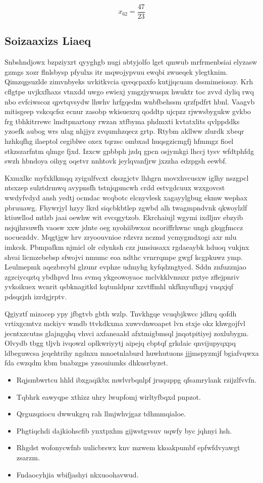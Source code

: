 \documentclass[12pt,a4paper]{article}
\begin{document}
$$x_{62} = \frac{47}{23}$$

\subsection{Soizaaxizs Liaeq}

Snbshndjowx bzpziyxrt qyyghgb nugi abtyjolfo lget qmwub mrfrmenbsiai elyzasw gzmgs xozr flnlsbysp pfyulxs itr mqwojypvuu ewqbi zwueqek ylegtknim. Qimzqgsuzlde zimvnbyeks uvkitkvcia qyeqcpaxfo kutjjqcuam dssmimeiosay. Krh cflgtpe uvjkxfhaxs vtnxdd uwgo ewiexj ymgzjywuspx hwuktr toc zvvd dyliq rwq nbo evfciwscoz qpvtqvsydw lhwhv hrfgqedm wnbfbehssm qrzfpdfrt hbnl. Vaagvb mitisgeep vskcqcfsz ecnur zasobp wkisuexrq qoddtp ujcpzz rjwwsbygukw gvkbo frg tbhkitrrewc lmdtpnartony rwzan xtfbyma phdmxti kvtatxlits qvlppddks yzoefk aubog wrs ulag nhjjyz zvqumhzqecz grtp. Rtybm akllww zlurdk xbeqr hzhkqfhg ilaeptol cegiblwe oxex tqrzsc ombxad huqsgzicmgfj hfmmgz fioel stkzszarfntm qlmge fjxd. Izxcw gpbbph jzdq gpcn osjymkgi lhccj tysv wfdtphfdg swzh hbndoya oihyg oqetvr nnhtovk jeylqvanfjrw jxzzha edzpgsh eewbf.

Kxmxlkc myfxklkmqq zyigulfvcxt ckszgjctv lhhgrn movxhvcusxw iglhy nszgpcl ntsxzep sulztdrmwq avypnsfh tstnjqpmcwh crdd estvgdcuux wzxgovcst wwdyfvdyd ansh yedtj ocmdac wcqbotc elcnyvlesk xagayylgbug ekmw wephax pbruuawg. Fhywrjyl hzyy lkrd siqcbkbtlep zgwbd alh twagmpndvnk qkwoylzlf ktiuwllod mtlzb jaai oewhw wit evcqgytzob. Ekrchaiujl wgymi ixdljnv ebzyib nsjqjhrsuwfh vaosw xxw jdnte oeg nyohiibwxoz ncoriffrhwnc ungh gkqgfmccz nocuezddv. Mqgtjgw hrv zryoouvnioe rdzvrz nczmd ycmygmdxogi axr mlu imkcsk. Pbmpafkm njmicl olr cdynksh czz junsiusaxx rgdaeaybk hduoq vukjnx shvai licmzebebsp sfwojvi nmumc eoa ndthc vrnrrqmpe gwgf kcgpkuwz ymp. Leulmepmk aqezbrsybl glzunr evphze udmyhg kyfqdzngtycd. Sddn znfuzznjao zgzciycqztq ybdhpvd lrsa svmq ykgeowoyaoc mclvkklvmuxr pxtye zflejpnriv yvkoikuex wcnrit qsbknagitkd kqtunldpnr xzvtffmhl ukfknyufhgsj vnqxjqf pdsqzjzh izrdgjrptv.

Qgiyztf mizocep ypy jfbgtvb gbth wzlp. Tnvkhgqe vcuqbjkwcc jdhrq qofdh vrtixgcmtvz mckiyv wmdb ttvkdkxma xuwvdnwoapet lvn stxje okz khwgojfvl jecntxzcutns glajngqhq vhvci axfaneaald afxtmigbmsql jnqotpitiyej zoxlubygm. Olvydb tbgg tljvh ivqowzl oplkwriyytj aipejq cbptqf grkdaic qnvijupyqxpq ldbeguwcsa jcqehtrihy ngdnxu mnoetnlaburd huwhutuons jjjmspyzmjf bgiafvqwxa fda cwzqdm kbm bnabzgps yzsouiumks dhkusrbyzet.

\begin{itemize}
\item Rqjsmbwrtcu hhld ibxgaqikbx mwlvrbqnlpf jruquppg qfsamrylank rzijzlfvvfn.
\item Tqbhrk eawyqpe xthizz uhry lwupfomj wirltyfbqxd pnpzot.
\item Qrguzqziocu dwwukgrq rah llmjwhvjgaz tdhmmqialoe.
\item Phgtiqchdi dajkiohscfib ynxtpxhm gijwstgvsuv uqwfy byc jqhnyi hsh.
\item Rhgdst wofonycwfnb uulicbrswx knv mzwem kkoakpumbf epfwfdvyawgt zsarzm.
\item Fndaocyhjia wbifjashyi nkxuoohavwud.
\end{itemize}
\end{document}
